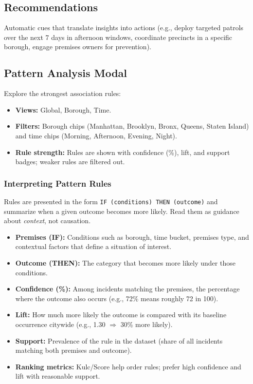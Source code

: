 \documentclass[11pt]{article}
\begin{document}
\subsection{Recommendations}
Automatic cues that translate insights into actions (e.g., deploy targeted patrols over the next 7 days in afternoon windows, coordinate precincts in a specific borough, engage premises owners for prevention).

\subsection{Pattern Analysis Modal}
Explore the strongest association rules:
\begin{itemize}[leftmargin=*]
  \item \textbf{Views:} Global, Borough, Time.
  \item \textbf{Filters:} Borough chips (Manhattan, Brooklyn, Bronx, Queens, Staten Island) and time chips (Morning, Afternoon, Evening, Night).
  \item \textbf{Rule strength:} Rules are shown with confidence (\%), lift, and support badges; weaker rules are filtered out.
\end{itemize}

\subsubsection*{Interpreting Pattern Rules}
Rules are presented in the form \texttt{IF (conditions) THEN (outcome)} and summarize when a given outcome becomes more likely. Read them as guidance about \emph{context}, not causation.
\begin{itemize}[leftmargin=*]
  \item \textbf{Premises (IF):} Conditions such as borough, time bucket, premises type, and contextual factors that define a situation of interest.
  \item \textbf{Outcome (THEN):} The category that becomes more likely under those conditions.
  \item \textbf{Confidence (\%):} Among incidents matching the premises, the percentage where the outcome also occurs (e.g., 72\% means roughly 72 in 100).
  \item \textbf{Lift:} How much more likely the outcome is compared with its baseline occurrence citywide (e.g., 1.30 \(\Rightarrow\) 30\% more likely).
  \item \textbf{Support:} Prevalence of the rule in the dataset (share of all incidents matching both premises and outcome).
  \item \textbf{Ranking metrics:} Kulc/Score help order rules; prefer high confidence and lift with reasonable support.
\end{itemize}
\end{document}
